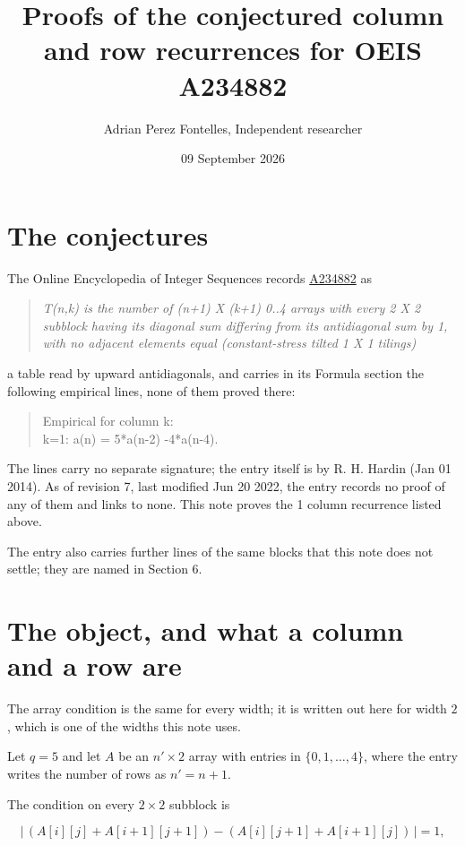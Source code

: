 \documentclass[11pt]{article}
\title{Proofs of the conjectured column and row recurrences for OEIS A234882}
\author{Adrian Perez Fontelles, Independent researcher}
\date{09 September 2026}
\theoremstyle{definition}
\begin{document}
\maketitle
\section{The conjectures}

The Online Encyclopedia of Integer Sequences records \href{https://oeis.org/A234882}{A234882} as

\begin{quote}\itshape T(n,k) is the number of (n+1) X (k+1) 0..4 arrays with every 2 X 2 subblock having its diagonal sum differing from its antidiagonal sum by 1, with no adjacent elements equal (constant-stress tilted 1 X 1 tilings)\end{quote}

a table read by upward antidiagonals, and carries in its Formula section the following empirical lines, none of them proved there:

\begin{quote}\ttfamily Empirical for column k:\\
k=1: a(n) = 5*a(n-2) -4*a(n-4).\end{quote}

The lines carry no separate signature; the entry itself is by R. H. Hardin (Jan 01 2014). As of revision 7, last modified Jun 20 2022, the entry records no proof of any of them and links to none. This note proves the 1 column recurrence listed above.

The entry also carries further lines of the same blocks that this note does not settle; they are named in Section 6.

\section{The object, and what a column and a row are}

The array condition is the same for every width; it is written out here for width $2$, which is one of the widths this note uses.

Let $q = 5$ and let $A$ be an $n' \times 2$ array with entries in $\{0,1,\dots,4\}$, where the entry writes the number of rows as $n' = n + 1$.

The condition on every $2 \times 2$ subblock is

\[\bigl|\,(A[i][j] + A[i{+}1][j{+}1]) - (A[i][j{+}1] + A[i{+}1][j])\,\bigr| = 1,\]
\end{document}

